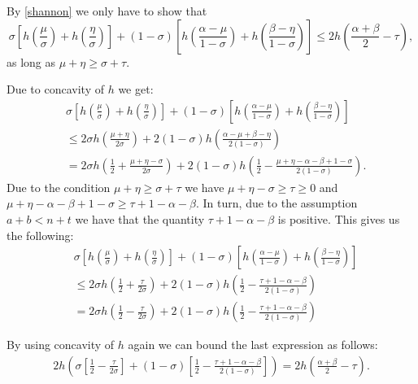 \documentclass[12pt]{article}
\let\leq\leqslant
\let\geq\geqslant
\let\le\leq
\let\ge\geq
\begin{document}
By \eqref{shannon} we only have to show that
$$ \sigma\left[h\left(\frac{\mu}{\sigma}\right) + h\left(\frac{\eta}{\sigma}\right)\right] + (1 - \sigma) \left[h\left(\frac{\alpha - \mu}{1 - \sigma}\right) + h\left(\frac{\beta - \eta}{1 - \sigma}\right)\right] \le 2h\left(\frac{\alpha + \beta}{2} - \tau\right), $$
as long as $\mu + \eta \ge \sigma + \tau$.

Due to concavity of $h$ 
we get:
\begin{align*}
&\sigma\left[h\left(\frac{\mu}{\sigma}\right) + h\left(\frac{\eta}{\sigma}\right)\right] + (1 - \sigma) \left[h\left(\frac{\alpha - \mu}{1 - \sigma}\right) + h\left(\frac{\beta - \eta}{1 - \sigma}\right)\right] \\
&\le 2\sigma h\left(\frac{\mu + \eta}{2\sigma}\right) + 2(1 - \sigma) h\left(\frac{\alpha - \mu + \beta - \eta}{2(1 -\sigma)}\right) \\
&= 2\sigma h\left(\frac{1}{2} + \frac{\mu + \eta - \sigma}{2\sigma}\right) + 2(1 - \sigma) h\left(\frac{1}{2} - \frac{\mu + \eta - \alpha - \beta + 1 - \sigma}{2(1 - \sigma)}\right).
\end{align*}
Due to the condition $\mu + \eta \ge \sigma + \tau$ we have
 $\mu + \eta - \sigma \ge \tau \ge 0$ and $\mu + \eta - \alpha - \beta + 1 - \sigma\ge \tau + 1 - \alpha - \beta$. In turn, due to the assumption $a + b < n + t$ we have that the quantity $\tau + 1 - \alpha - \beta$ is positive. This gives us the following:
\begin{align*}
&\sigma\left[h\left(\frac{\mu}{\sigma}\right) + h\left(\frac{\eta}{\sigma}\right)\right] + (1 - \sigma) \left[h\left(\frac{\alpha - \mu}{1 - \sigma}\right) + h\left(\frac{\beta - \eta}{1 - \sigma}\right)\right]\\
&\le 2\sigma h\left(\frac{1}{2} + \frac{\tau}{2\sigma}\right) + 2(1 - \sigma) h\left(\frac{1}{2} - \frac{\tau + 1 - \alpha - \beta}{2(1 - \sigma)}\right) \\
&= 2\sigma h\left(\frac{1}{2} - \frac{\tau}{2\sigma}\right) + 2(1 - \sigma) h\left(\frac{1}{2} - \frac{\tau + 1 - \alpha - \beta}{2(1 - \sigma)}\right)
\end{align*}

By using concavity of $h$ again we can bound the last expression as follows:
\begin{align*}
2h\left(\sigma\left[\frac{1}{2} - \frac{\tau}{2\sigma}\right] + (1 - \sigma)\left[\frac{1}{2} - \frac{\tau + 1 - \alpha - \beta}{2(1 - \sigma)}\right]\right) = 2h\left(\frac{\alpha + \beta}{2} - \tau\right).
\end{align*}
\end{document}
